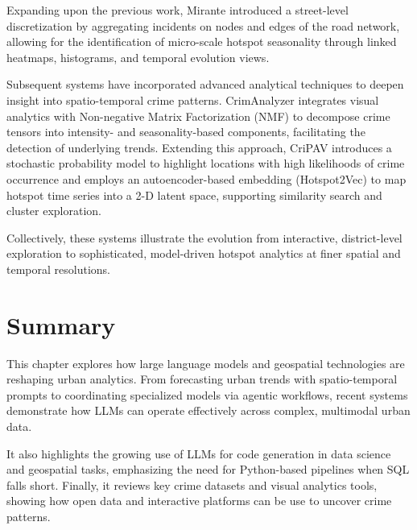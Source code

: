 Expanding upon the previous work, Mirante \citep{Garcia2020MiranteAV} introduced a street-level discretization by aggregating incidents on nodes and edges of the road network, allowing for the identification of micro-scale hotspot seasonality through linked heatmaps, histograms, and temporal evolution views.

Subsequent systems have incorporated advanced analytical techniques to deepen insight into spatio-temporal crime patterns. CrimAnalyzer \citep{Garcia2021CrimAnalyzer} integrates visual analytics with Non-negative Matrix Factorization (NMF) to decompose crime tensors into intensity- and seasonality-based components, facilitating the detection of underlying trends. Extending this approach, CriPAV \citep{Garcia2022CriPAV} introduces a stochastic probability model to highlight locations with high likelihoods of crime occurrence and employs an autoencoder-based embedding (Hotspot2Vec) to map hotspot time series into a 2-D latent space, supporting similarity search and cluster exploration. 

Collectively, these systems illustrate the evolution from interactive, district-level exploration to sophisticated, model-driven hotspot analytics at finer spatial and temporal resolutions.





\section{Summary}

This chapter explores how large language models and geospatial technologies are reshaping urban analytics. From forecasting urban trends with spatio-temporal prompts to coordinating specialized models via agentic workflows, recent systems demonstrate how LLMs can operate effectively across complex, multimodal urban data.

It also highlights the growing use of LLMs for code generation in data science and geospatial tasks, emphasizing the need for Python-based pipelines when SQL falls short. Finally, it reviews key crime datasets and visual analytics tools, showing how open data and interactive platforms can be use to uncover crime patterns.

